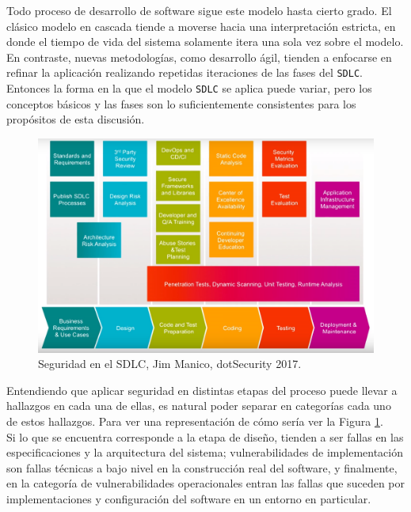Todo proceso de desarrollo de software sigue este modelo hasta cierto grado. El clásico modelo en cascada tiende a moverse hacia una interpretación estricta, en donde el tiempo de vida del sistema solamente itera una sola vez sobre el modelo. En contraste, nuevas metodologías, como desarrollo ágil\cite{ries2012metodo}, tienden a enfocarse en refinar la aplicación realizando repetidas iteraciones de las fases del \texttt{SDLC}. Entonces la forma en la que el modelo \texttt{SDLC} se aplica puede variar, pero los conceptos básicos y las fases son lo suficientemente consistentes para los propósitos de esta discusión.\\

\begin{figure}[ht]
    \centering
    \includegraphics[scale=0.19]{images/JimManicodeSSDLC.png}
    \caption{Seguridad en el SDLC, Jim Manico, dotSecurity 2017.}
    \label{fig:ssdlc}
\end{figure}

Entendiendo que aplicar seguridad en distintas etapas del proceso puede llevar a hallazgos en cada una de ellas, es natural poder separar en categorías cada uno de estos hallazgos. Para ver una representación de cómo sería ver la Figura \ref{fig:ssdlc}.\\

Si lo que se encuentra corresponde a la etapa de diseño, tienden a ser fallas en las especificaciones y la arquitectura del sistema; vulnerabilidades de implementación son fallas técnicas a bajo nivel en la construcción real del software, y finalmente, en la categoría de vulnerabilidades operacionales  entran las fallas que suceden por implementaciones y configuración del software en un entorno en particular.\\

